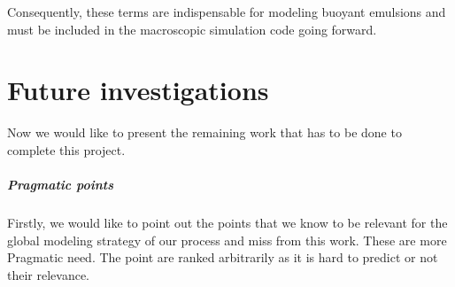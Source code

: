 Consequently, these terms are indispensable for modeling buoyant emulsions and must be included in the macroscopic simulation code going forward.

\chapter*{Future investigations}

Now we would like to present the remaining work that has to be done to complete this project. 


\paragraph*{Pragmatic points}
Firstly,  we would like to point out the points that we know to be relevant for the global modeling strategy of our process and miss from this work.
These are more Pragmatic need.  
The point are ranked arbitrarily as it is hard to predict or not their relevance. 
